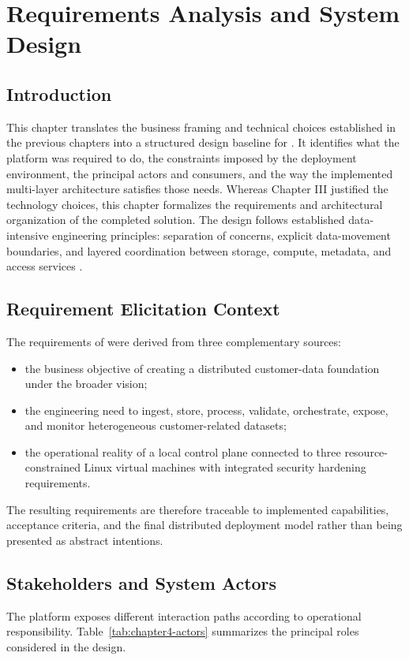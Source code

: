 \chapter{Requirements Analysis and System Design}

\section{Introduction}
This chapter translates the business framing and technical choices established in the previous chapters into a structured design baseline for \projectname{}. It identifies what the platform was required to do, the constraints imposed by the deployment environment, the principal actors and consumers, and the way the implemented multi-layer architecture satisfies those needs. Whereas Chapter III justified the technology choices, this chapter formalizes the requirements and architectural organization of the completed solution. The design follows established data-intensive engineering principles: separation of concerns, explicit data-movement boundaries, and layered coordination between storage, compute, metadata, and access services \cite{kleppmann2017ddia,armbrust2021lakehouse}.

\section{Requirement Elicitation Context}
The requirements of \projectname{} were derived from three complementary sources:
\begin{itemize}
    \item the business objective of creating a distributed customer-data foundation under the broader \initiative{} vision;
    \item the engineering need to ingest, store, process, validate, orchestrate, expose, and monitor heterogeneous customer-related datasets;
    \item the operational reality of a local control plane connected to three resource-constrained Linux virtual machines with integrated security hardening requirements.
\end{itemize}

The resulting requirements are therefore traceable to implemented capabilities, acceptance criteria, and the final distributed deployment model rather than being presented as abstract intentions.

\section{Stakeholders and System Actors}
The platform exposes different interaction paths according to operational responsibility. Table~\ref{tab:chapter4-actors} summarizes the principal roles considered in the design.

